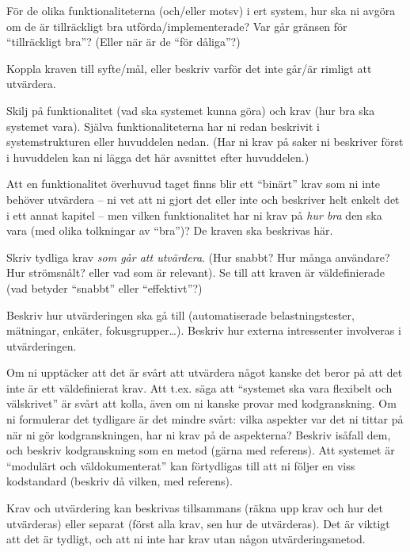 För de olika funktionaliteterna (och/eller motsv) i ert system, hur ska ni avgöra om de är tillräckligt bra utförda/implementerade? Var går gränsen för ``tillräckligt bra''? (Eller när är de ``för dåliga''?)

Koppla kraven till syfte/mål, eller beskriv varför det inte går/är rimligt att utvärdera.

Skilj på funktionalitet (vad ska systemet kunna göra) och krav (hur bra ska systemet vara). Själva funktionaliteterna har ni redan beskrivit i systemstrukturen eller huvuddelen nedan. (Har ni krav på saker ni beskriver först i huvuddelen kan ni lägga det här avsnittet efter huvuddelen.)

Att en funktionalitet överhuvud taget finns blir ett ``binärt'' krav som ni inte behöver utvärdera -- ni vet att ni gjort det eller inte och beskriver helt enkelt det i ett annat kapitel  -- men vilken funktionalitet har ni krav på \emph{hur bra} den ska vara (med olika tolkningar av ``bra'')? De kraven ska beskrivas här.

Skriv tydliga krav \emph{som går att utvärdera}.  (Hur snabbt? Hur många användare? Hur strömsnålt? eller vad som är relevant). Se till att kraven är väldefinierade (vad betyder ``snabbt'' eller ``effektivt''?)

Beskriv hur utvärderingen ska gå till (automatiserade belastningstester, mätningar, en\-käter, fokusgrupper\ldots).
Beskriv hur externa intressenter involveras i utvärderingen.

Om ni upptäcker att det är svårt att utvärdera något kanske det beror på att det inte är ett väldefinierat krav. Att t.ex. säga att ``systemet ska vara flexibelt och välskrivet'' är svårt att kolla, även om ni kanske provar med kodgranskning.
 Om ni formulerar det tydligare är det mindre svårt: vilka aspekter var det ni tittar på när ni gör kodgranskningen, har ni krav på de aspekterna? Beskriv isåfall dem, och beskriv kodgranskning som en metod (gärna med referens). Att systemet är ``modulärt och väldokumenterat'' kan förtydligas till att ni följer en viss kodstandard (beskriv då vilken, med referens).

Krav och utvärdering kan beskrivas tillsammans (räkna upp krav och hur det utvärderas) eller separat (först alla krav, sen hur de utvärderas). Det är viktigt att det är tydligt, och att ni inte har krav utan någon utvärderingsmetod.